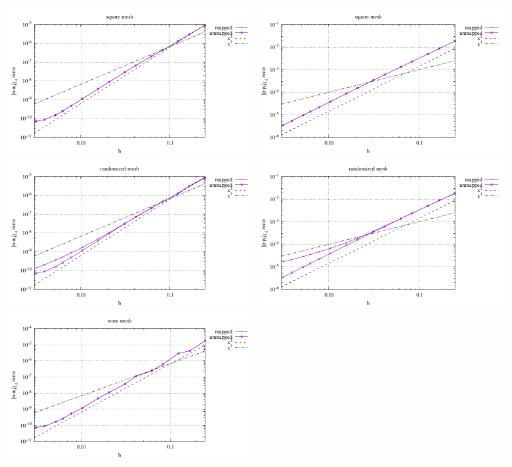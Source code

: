 \begin{center}
\includegraphics[width=6.5cm]{python_codes/fieldstone_76/results/bench4/straight/errors_V_mt1.pdf}
\includegraphics[width=6.5cm]{python_codes/fieldstone_76/results/bench4/straight/errors_P_mt1.pdf}\\
\includegraphics[width=6.5cm]{python_codes/fieldstone_76/results/bench4/straight/errors_V_mt2.pdf}
\includegraphics[width=6.5cm]{python_codes/fieldstone_76/results/bench4/straight/errors_P_mt2.pdf}\\
\includegraphics[width=6.5cm]{python_codes/fieldstone_76/results/bench4/straight/errors_V_mt3.pdf}

\end{center}
